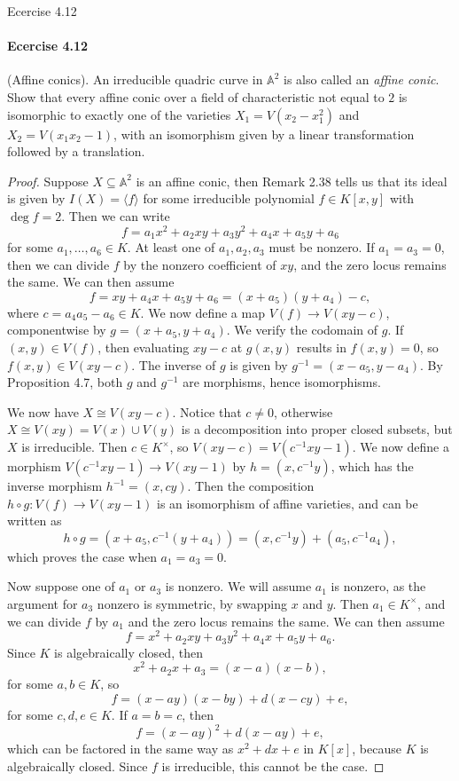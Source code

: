 \documentclass[12pt]{article}
\newenvironment{fullbox}{\begin{lrbox}{\savefullbox}\begin{minipage}{\dimexpr\textwidth-2\fboxsep\relax}}{\end{minipage}\end{lrbox}\begin{center}\framebox[\textwidth]{\usebox{\savefullbox}}\end{center}}
\newenvironment{pbox}[1][]{\begin{fullbox}\ifx#1\empty\else\paragraph{#1}\fi}{\end{fullbox}}
\theoremstyle{definition}
\newcommand{\A}{\mathbb{A}}
\newcommand{\<}{\langle}
\renewcommand{\>}{\rangle}
\newcommand{\isom}{\cong}
\begin{document}
\thispagestyle{title}


\begin{pbox}[Ecercise 4.12]
    (Affine conics). An irreducible quadric curve in $\A^2$ is also called an \textit{affine conic}. Show that every affine conic over a field of characteristic not equal to $2$ is isomorphic to exactly one of the varieties $X_1 = V(x_2 - x_1^2)$ and $X_2 = V(x_1x_2 - 1)$, with an isomorphism given by a linear transformation followed by a translation.
\end{pbox}

\begin{proof}
    Suppose $X \subseteq \A^2$ is an affine conic, then Remark 2.38 tells us that its ideal is given by $I(X) = \<f\>$ for some irreducible polynomial $f \in K[x, y]$ with $\deg f = 2$. Then we can write
    \[
        f = a_1x^2 + a_2xy + a_3y^2 + a_4x + a_5y + a_6
    \]
    for some $a_1, \dots, a_6 \in K$. At least one of $a_1, a_2, a_3$ must be nonzero. If $a_1 = a_3 = 0$, then we can divide $f$ by the nonzero coefficient of $xy$, and the zero locus remains the same. We can then assume
    \[
        f = xy + a_4x + a_5y + a_6 = (x + a_5)(y + a_4) - c,
    \]
    where $c = a_4a_5 - a_6 \in K$. We now define a map $ V(f) \to V(xy - c)$, componentwise by $g = (x + a_5, y + a_4)$. We verify the codomain of $g$. If $(x, y) \in V(f)$, then evaluating $xy - c$ at $g(x, y)$ results in $f(x, y) = 0$, so $f(x, y) \in V(xy - c)$. The inverse of $g$ is given by $g^{-1} = (x - a_5, y - a_4)$. By Proposition 4.7, both $g$ and $g^{-1}$ are morphisms, hence isomorphisms. 
    
    We now have $X \isom V(xy - c)$. Notice that $c \ne 0$, otherwise $X \isom V(xy) = V(x) \cup V(y)$ is a decomposition into proper closed subsets, but $X$ is irreducible. Then $c \in K^\times$, so $V(xy - c) = V(c^{-1}xy - 1)$. We now define a morphism $V(c^{-1}xy - 1) \to V(xy - 1)$ by $h = (x, c^{-1}y)$, which has the inverse morphism $h^{-1} = (x, cy)$. Then the composition $h \circ g : V(f) \to V(xy - 1)$ is an isomorphism of affine varieties, and can be written as
    \[
        h \circ g = (x + a_5, c^{-1}(y + a_4)) = (x, c^{-1}y) + (a_5, c^{-1}a_4),
    \]
    which proves the case when $a_1 = a_3 = 0$.

    Now suppose one of $a_1$ or $a_3$ is nonzero. We will assume $a_1$ is nonzero, as the argument for $a_3$ nonzero is symmetric, by swapping $x$ and $y$. Then $a_1 \in K^\times$, and we can divide $f$ by $a_1$ and the zero locus remains the same. We can then assume
    \[
        f = x^2 + a_2xy + a_3y^2 + a_4x + a_5y + a_6.
    \]
    Since $K$ is algebraically closed, then 
    \[
        x^2 + a_2x + a_3 = (x - a)(x - b),
    \]
    for some $a, b \in K$, so
    \[
        f = (x - ay)(x - by) + d(x - cy) + e,
    \]
    for some $c, d, e \in K$. If $a = b = c$, then
    \[
        f = (x - ay)^2 + d(x - ay) + e,
    \]
    which can be factored in the same way as $x^2 + dx + e$ in $K[x]$, because $K$ is algebraically closed. Since $f$ is irreducible, this cannot be the case.


\end{proof}
\end{document}
